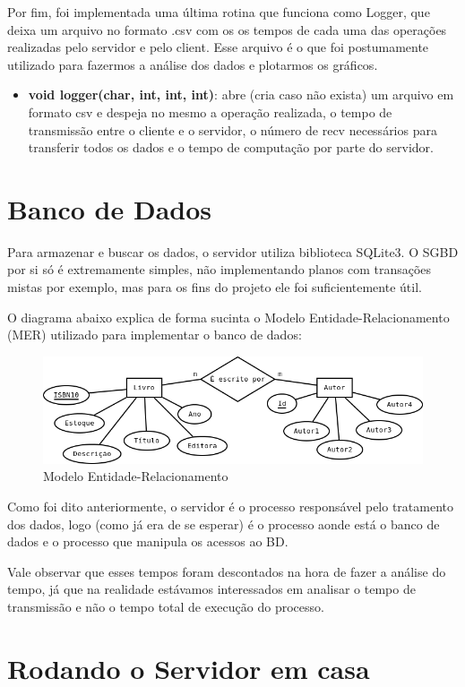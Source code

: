 \documentclass[10pt,a4paper]{report}
\begin{document}
Por fim, foi implementada uma última rotina que funciona como Logger, que deixa um arquivo no formato .csv com os os tempos de cada uma das operações realizadas pelo servidor e pelo client. Esse arquivo é o que foi postumamente utilizado para fazermos a análise dos dados e plotarmos os gráficos.
\begin{itemize}
\item \textbf{void logger(char, int, int, int)}: abre (cria caso não exista) um arquivo em formato csv e despeja no mesmo a operação realizada, o tempo de transmissão entre o cliente e o servidor, o número de recv necessários para transferir todos os dados e o tempo de computação por parte do servidor.
\end{itemize}

\chapter{Banco de Dados}
	Para armazenar e buscar os dados, o servidor utiliza biblioteca SQLite3. O SGBD por si só é extremamente simples, não implementando planos com transações mistas por exemplo, mas para os fins do projeto ele foi suficientemente útil.
	
	O diagrama abaixo explica de forma sucinta o Modelo Entidade-Relacionamento (MER) utilizado para implementar o banco de dados:
	
\begin{figure}[h!]
\caption{Modelo Entidade-Relacionamento}
\includegraphics[width=\textwidth]{Imagens/mer.png}
\end{figure}

Como foi dito anteriormente, o servidor é o processo responsável pelo tratamento dos dados, logo (como já era de se esperar) é o processo aonde está o banco de dados e o processo que manipula os acessos ao BD.

	Vale observar que esses tempos foram descontados na hora de fazer a análise do tempo, já que na realidade estávamos interessados em analisar o tempo de transmissão e não o tempo total de execução do processo.

\chapter{Rodando o Servidor em casa}
\end{document}
